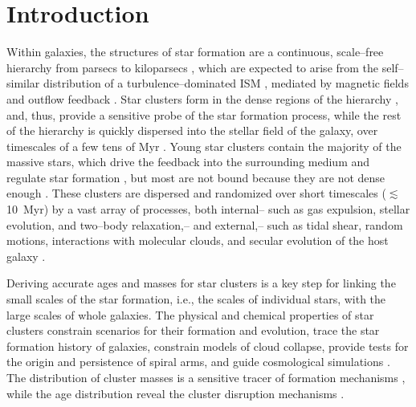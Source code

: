 \documentclass{aastex63}
\begin{document}


\section{Introduction} \label{sec:intro}

Within galaxies, the structures of star formation are a continuous, scale--free hierarchy from parsecs to
kiloparsecs \citep{lada2003, Elmegreen2003, Bressert+2010}, which are expected to arise from
the self--similar distribution of a turbulence--dominated ISM \citep{Elmegreen+1997}, mediated by
magnetic fields and outflow feedback \citep[e.g.,][]{Krumholz+2019}. Star clusters form in the dense regions of the hierarchy \citep[e.g.,][]{Elmegreen2010}, and, thus, provide a sensitive probe of the star formation process, while the rest of the hierarchy is quickly dispersed into the stellar field of the galaxy, over timescales of a few tens of Myr \citep{bastian2008, Longmore2014, grasha2015, grasha2017a}. Young star clusters contain the majority of the massive stars, which drive the feedback into the surrounding medium and regulate star formation \citep{Krumholz+2019, Adamo+2020}, but most are not bound because they are not dense enough \citep[e.g.][]{BrownGnedin2021}. These clusters are dispersed and randomized over short timescales ($\lesssim$10~Myr) by a vast array of processes, both internal-- such as gas expulsion, stellar evolution, and two–body relaxation,-- and external,-- such as tidal shear, random motions, interactions with molecular clouds, and secular evolution of the host galaxy \citep[e.g.,][]{GielesBastian2008}. 

Deriving accurate ages and masses for star clusters is a key step for linking the small scales of the star formation, i.e., the scales of individual stars, with the large scales of whole galaxies. The physical and chemical properties of star clusters constrain scenarios for their formation and evolution, trace the star formation history of galaxies, constrain models of cloud collapse, provide tests for the origin and persistence of spiral arms, and guide cosmological simulations \citep{Shabani+2018, Li+2018, Adamo+2020,  BallesterosParedes+2020}. The distribution of cluster masses is a sensitive tracer of formation mechanisms \citep[e.g.][]{whitmore1999, larsen2002, gieles2006a, gieles2006b, whitmore2014, johnson2017, Adamo+2020}, while the age distribution reveal the cluster disruption mechanisms \citep[e.g.,][]{Gieles2009, Bastian2012, SilvaVilla+2014, chandar2016, Adamo+2017, messa2018b}. 
\end{document}
